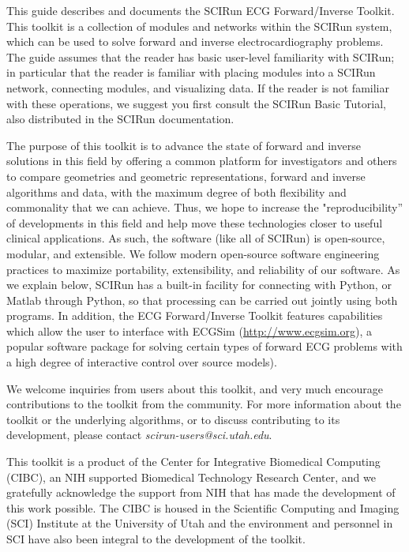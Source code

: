 \begin{introduction}

This guide describes and documents the SCIRun ECG Forward/Inverse
Toolkit. This toolkit is a collection of modules and networks
within the SCIRun system, which can be used to solve forward and inverse
electrocardiography problems. The guide assumes that the reader has basic
user-level familiarity with SCIRun; in particular that the reader is
familiar with placing modules into a SCIRun network, connecting modules,
and visualizing data. If the reader is not familiar with these operations,
we suggest you first consult the SCIRun Basic Tutorial, also distributed in
the SCIRun documentation.

The purpose of this toolkit is to advance the state of forward and inverse
solutions in this field by offering a common platform for investigators and
others to compare geometries and geometric representations, forward and 
inverse algorithms and data, with the maximum degree of both flexibility
and commonality that we can achieve. Thus, we hope to increase the
"reproducibility'' of developments in this field and help
move these technologies closer to useful clinical applications. As such, the
software (like all of SCIRun) is open-source, modular, and extensible. We
follow modern open-source software engineering practices to maximize
portability, extensibility, and reliability of our software. As we explain below, SCIRun has a
built-in facility for connecting with Python, or Matlab through Python, so that processing can be
carried out jointly using both programs. In
addition, the ECG Forward/Inverse Toolkit features capabilities which allow
the user to interface with ECGSim (\href{http://www.ecgsim.org}{http://www.ecgsim.org}), a
popular software package for solving certain types of forward ECG problems
with a high degree of interactive control over source models).

We welcome inquiries from users about this toolkit, and very much encourage
contributions to the toolkit from the community. For more information
about the toolkit or the underlying algorithms, or to discuss contributing to
its development, please contact \textit{scirun-users@sci.utah.edu}.

This toolkit is a product of the Center for Integrative Biomedical
Computing (CIBC), an NIH supported Biomedical Technology Research Center,
and we gratefully acknowledge the support from NIH that has made the
development of this work possible. The CIBC is housed in the Scientific
Computing and Imaging (SCI) Institute at the University of Utah and the
environment and personnel in SCI have also been integral to the development of the toolkit.

\end{introduction}

